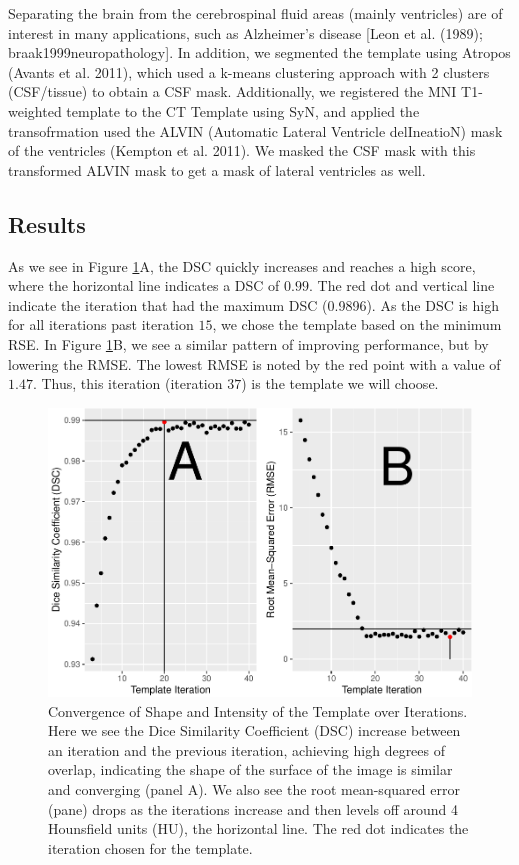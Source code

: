 \documentclass[]{elsarticle} %
\makeatletter
\def\maxwidth{\ifdim\Gin@nat@width>\linewidth\linewidth
\else\Gin@nat@width\fi}
\let\Oldincludegraphics\includegraphics
\renewcommand{\includegraphics}[1]{\Oldincludegraphics[width=\maxwidth]{#1}}
\makeatother
\begin{document}
Separating the brain from the cerebrospinal fluid areas (mainly ventricles) are of interest in many applications, such as Alzheimer's disease {[}Leon et al. (1989); braak1999neuropathology{]}. In addition, we segmented the template using Atropos (Avants et al. 2011), which used a k-means clustering approach with 2 clusters (CSF/tissue) to obtain a CSF mask. Additionally, we registered the MNI T1-weighted template to the CT Template using SyN, and applied the transofrmation used the ALVIN (Automatic Lateral Ventricle delIneatioN) mask of the ventricles (Kempton et al. 2011). We masked the CSF mask with this transformed ALVIN mask to get a mask of lateral ventricles as well.

\hypertarget{results}{%
\subsection{Results}\label{results}}

As we see in Figure \ref{fig:performance}A, the DSC quickly increases and reaches a high score, where the horizontal line indicates a DSC of \(0.99\). The red dot and vertical line indicate the iteration that had the maximum DSC (0.9896). As the DSC is high for all iterations past iteration \(15\), we chose the template based on the minimum RSE. In Figure \ref{fig:performance}B, we see a similar pattern of improving performance, but by lowering the RMSE. The lowest RMSE is noted by the red point with a value of \(1.47\). Thus, this iteration (iteration \(37\)) is the template we will choose.

\begin{figure}
\centering
\includegraphics{index_files/figure-latex/performance-1.pdf}
\caption{\label{fig:performance}Convergence of Shape and Intensity of the Template over Iterations. Here we see the Dice Similarity Coefficient (DSC) increase between an iteration and the previous iteration, achieving high degrees of overlap, indicating the shape of the surface of the image is similar and converging (panel A). We also see the root mean-squared error (pane) drops as the iterations increase and then levels off around 4 Hounsfield units (HU), the horizontal line. The red dot indicates the iteration chosen for the template.}
\end{figure}
\end{document}
